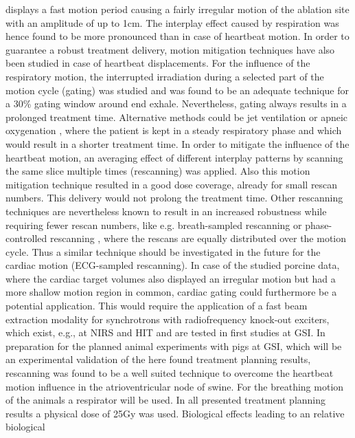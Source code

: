 \documentclass[type=dr, dr=rernat, accentcolor=tud7b,colorbacktitle, bigchapter, openright, twoside, 12pt ]{tudthesis}
\begin{document}
displays a fast motion period causing a fairly irregular motion of the ablation site with an amplitude of up to 1cm. The interplay effect 
caused by respiration was hence found to be more pronounced than in case of heartbeat motion. In order to guarantee a robust treatment 
delivery, motion mitigation techniques have also been studied in case of heartbeat displacements. 
For the influence of the respiratory motion, the interrupted irradiation during a selected part of the motion cycle (gating) \cite{Kub96} was 
studied and was found to be an adequate technique for a 30\% gating window around end exhale. Nevertheless, gating always results in a 
prolonged treatment time. Alternative methods could be jet ventilation \cite{Hof03} or apneic oxygenation \cite{RPTC12}, where the patient is 
kept in a steady respiratory phase and which would result in a shorter treatment time. 
In order to mitigate the influence of the heartbeat motion, an averaging effect of different interplay patterns by scanning the same slice 
multiple times (rescanning) \cite{Phi92} was applied. Also this motion mitigation technique resulted in a good dose coverage, already for small 
rescan numbers. This delivery would not prolong the treatment time. Other rescanning techniques are nevertheless known to result in an 
increased robustness while requiring fewer rescan numbers, like e.g. breath-sampled rescanning \cite{Sec09} or phase-controlled rescanning 
\cite{Fur07}, where the rescans are equally distributed over the motion cycle. Thus a similar technique should be investigated in the 
future for the cardiac motion (ECG-sampled rescanning). In case of the studied porcine data, where the cardiac target volumes also displayed 
an irregular motion but had a more shallow motion region in common, cardiac gating could furthermore be a potential application. This would 
require the application of a fast beam extraction modality for synchrotrons with radiofrequency knock-out exciters, which exist, e.g., at  
NIRS \cite{Nod96} \cite{Fur05} and HIT \cite{Schoe11} and are tested in first studies at GSI. In preparation for the planned 
animal experiments with pigs at GSI, which will be an experimental validation of the here found treatment planning results, rescanning 
was found to be a well suited technique to overcome the heartbeat motion influence in the atrioventricular node of swine. For the breathing 
motion of the animals a respirator will be used. \newline
\newline
In all presented treatment planning results a physical dose of 25Gy was used. Biological effects leading to an relative biological 
\end{document}
